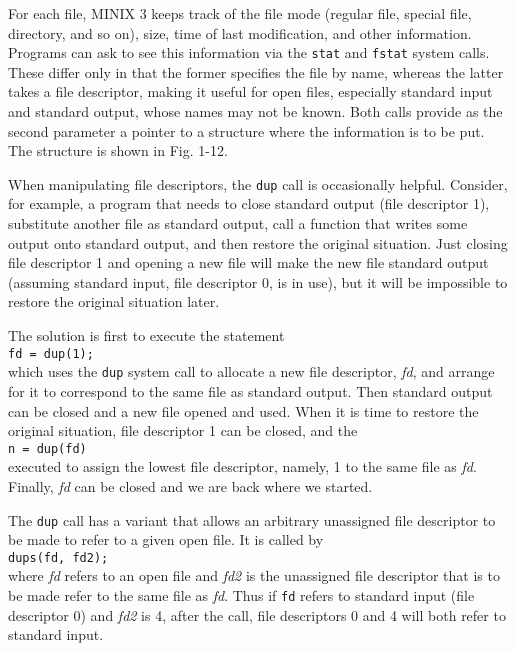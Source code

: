 \documentclass{book}
\newcommand {\sys} [1] {\textsl{#1}}
\newcommand {\cmd} [1] {\texttt{#1}}
\begin{document}
For each file, MINIX 3 keeps track of the file mode (regular file, special file, directory, and so on),
size, time of last modification, and other information.
Programs can ask to see this information via the \cmd{stat} and \cmd{fstat} system calls.
These differ only in that the former specifies the file by name, whereas the latter takes a file descriptor, 
making it useful for open files, especially standard input and standard output, whose names may not be known.
Both calls provide as the second parameter a pointer to a structure where the information is to be put.
The structure is shown in Fig. 1-12.

When manipulating file descriptors, the \cmd{dup} call is occasionally helpful.
Consider, for example, a program that needs to close standard output (file descriptor 1), substitute another file as standard output, 
call a function that writes some output onto standard output, and then restore the original situation.
Just closing file descriptor 1 and opening a new file will make the new file standard output 
(assuming standard input, file descriptor 0, is in use),
but it will be impossible to restore the original situation later.

The solution is first to execute the statement\\
\cmd{fd = dup(1);}\\
which uses the \cmd{dup} system call to allocate a new file descriptor, \sys{fd}, and arrange for it to correspond to the same file as standard output.
Then standard output can be closed and a new file opened and used.
When it is time to restore the original situation, file descriptor 1 can be closed, and the\\
\cmd{n = dup(fd)}\\
executed to assign the lowest file descriptor, namely, 1 to the same file as \sys{fd}.
Finally, \sys{fd} can be closed and we are back where we started.

The \cmd{dup} call has a variant that allows an arbitrary unassigned file descriptor to be made to refer to a given open file.
It is called by\\
\cmd{dups(fd, fd2);}\\
where \sys{fd} refers to an open file and \sys{fd2} is the unassigned file descriptor that is to be made refer to the same file as \sys{fd}.
Thus if \cmd{fd} refers to standard input (file descriptor 0) and \sys{fd2} is 4, after the call, 
file descriptors 0 and 4 will both refer to standard input.
\end{document}
